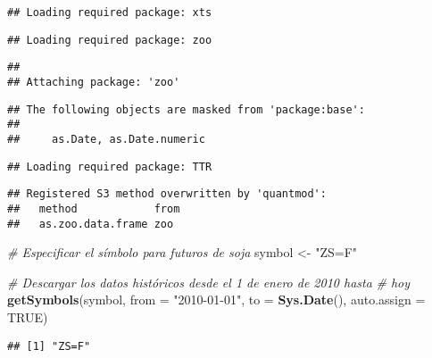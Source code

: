 \documentclass[
]{book}
\newenvironment{Shaded}{\begin{snugshade}}{\end{snugshade}}
\newcommand{\AttributeTok}[1]{\textcolor[rgb]{0.13,0.29,0.53}{#1}}
\newcommand{\CommentTok}[1]{\textcolor[rgb]{0.56,0.35,0.01}{\textit{#1}}}
\newcommand{\ConstantTok}[1]{\textcolor[rgb]{0.56,0.35,0.01}{#1}}
\newcommand{\FunctionTok}[1]{\textcolor[rgb]{0.13,0.29,0.53}{\textbf{#1}}}
\newcommand{\NormalTok}[1]{#1}
\newcommand{\OtherTok}[1]{\textcolor[rgb]{0.56,0.35,0.01}{#1}}
\newcommand{\StringTok}[1]{\textcolor[rgb]{0.31,0.60,0.02}{#1}}
\begin{document}
\begin{verbatim}
## Loading required package: xts
\end{verbatim}

\begin{verbatim}
## Loading required package: zoo
\end{verbatim}

\begin{verbatim}
## 
## Attaching package: 'zoo'
\end{verbatim}

\begin{verbatim}
## The following objects are masked from 'package:base':
## 
##     as.Date, as.Date.numeric
\end{verbatim}

\begin{verbatim}
## Loading required package: TTR
\end{verbatim}

\begin{verbatim}
## Registered S3 method overwritten by 'quantmod':
##   method            from
##   as.zoo.data.frame zoo
\end{verbatim}

\begin{Shaded}
\begin{Highlighting}[]
\CommentTok{\# Especificar el símbolo para futuros de soja}
\NormalTok{symbol }\OtherTok{\textless{}{-}} \StringTok{"ZS=F"}

\CommentTok{\# Descargar los datos históricos desde el 1 de enero de 2010 hasta}
\CommentTok{\# hoy}
\FunctionTok{getSymbols}\NormalTok{(symbol, }\AttributeTok{from =} \StringTok{"2010{-}01{-}01"}\NormalTok{, }\AttributeTok{to =} \FunctionTok{Sys.Date}\NormalTok{(), }
\AttributeTok{auto.assign =} \ConstantTok{TRUE}\NormalTok{)}
\end{Highlighting}
\end{Shaded}

\begin{verbatim}
## [1] "ZS=F"
\end{verbatim}
\end{document}
